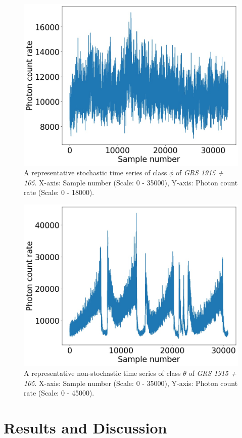 \documentclass[10pt,conference]{IEEEtran}
\begin{document}
\begin{figure}[ht]
\centering
\includegraphics[width=0.9\linewidth]{sac_ascf_phi.jpg}
\caption{A representative stochastic time series of class $\phi$ of \textit{GRS 1915 + 105}. X-axis: Sample number (Scale: 0 - 35000), Y-axis: Photon count rate (Scale: 0 - 18000). }
\label{phi_ts}
\end{figure}

\begin{figure}[ht]
\centering
\includegraphics[width=0.9\linewidth]{sac_ascf_theta.jpg}
\caption{A representative non-stochastic time series of class $\theta$ of \textit{GRS 1915 + 105}. X-axis: Sample number (Scale: 0 - 35000), Y-axis: Photon count rate (Scale: 0 - 45000). }
\label{theta_ts}
\end{figure}

\section{Results and Discussion}
\end{document}
